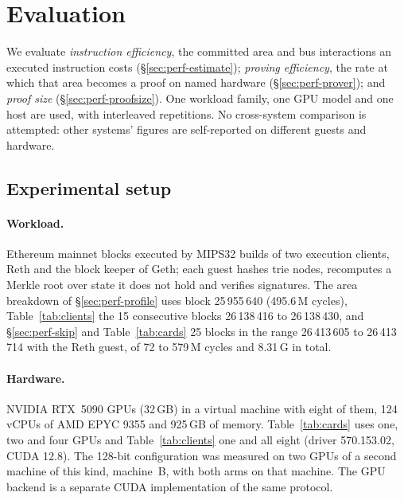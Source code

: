 \section{Evaluation}
\label{sec:performance}

We evaluate \emph{instruction efficiency}, the committed area and bus interactions an executed instruction costs (\S\ref{sec:perf-estimate}); \emph{proving efficiency}, the rate at which that area becomes a proof on named hardware (\S\ref{sec:perf-prover}); and \emph{proof size} (\S\ref{sec:perf-proofsize}). One workload family, one GPU model and one host are used, with interleaved repetitions. No cross-system comparison is attempted: other systems' figures are self-reported on different guests and hardware.

\subsection{Experimental setup}
\label{sec:perf-setup}

\paragraph{Workload.} Ethereum mainnet blocks executed by MIPS32 builds of two execution clients, Reth and the block keeper of Geth; each guest hashes trie nodes, recomputes a Merkle root over state it does not hold and verifies signatures. The area breakdown of \S\ref{sec:perf-profile} uses block 25\,955\,640 (495.6\,M cycles), Table~\ref{tab:clients} the 15 consecutive blocks 26\,138\,416 to 26\,138\,430, and \S\ref{sec:perf-skip} and Table~\ref{tab:cards} 25 blocks in the range 26\,413\,605 to 26\,413\,714 with the Reth guest, of 72 to 579\,M cycles and 8.31\,G in total.

\paragraph{Hardware.} NVIDIA RTX~5090 GPUs (32\,GB) in a virtual machine with eight of them, 124 vCPUs of AMD EPYC 9355 and 925\,GB of memory. Table~\ref{tab:cards} uses one, two and four GPUs and Table~\ref{tab:clients} one and all eight (driver 570.153.02, CUDA 12.8). The 128-bit configuration was measured on two GPUs of a second machine of this kind, machine~B, with both arms on that machine. The GPU backend is a separate CUDA implementation of the same protocol.

